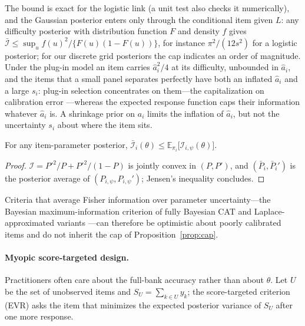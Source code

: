 The bound is exact for the logistic link (a unit test also checks it numerically), and the
Gaussian posterior enters only through the conditional item given $L$: any difficulty
posterior with distribution function $F$ and density $f$ gives
$\bar{\mathcal I}\le\sup_u f(u)^2/\{F(u)(1-F(u))\}$, for instance $\pi^2/(12s^2)$ for a
logistic posterior; for our discrete grid posteriors the cap indicates an order of magnitude.
Under the plug-in model an item carries $\hat a_i^2/4$ at its difficulty, unbounded in
$\hat a_i$, and the items that a small panel separates perfectly have both an inflated
$\hat a_i$ and a large $s_i$: plug-in selection concentrates on them---the capitalization on
calibration error \citep{vanderlinden2000capitalization,patton2013influence}---whereas the
expected response function caps their information whatever $\hat a_i$ is. A shrinkage prior on
$a_i$ limits the inflation of $\hat a_i$, but not the uncertainty $s_i$ about where the item
sits.

\begin{corollary}\label{cor:jensen}
For any item-parameter posterior, $\bar{\mathcal I}_i(\theta)\le\mathbb E_{\pi_i}\big[\mathcal I_{i,\psi}(\theta)\big]$.
\end{corollary}

\begin{proof}
$\mathcal I=P'^2/P+P'^2/(1-P)$ is jointly convex in $(P,P')$, and $(\bar P_i,\bar P_i')$ is
the posterior average of $(P_{i,\psi},P_{i,\psi}')$; Jensen's inequality concludes.
\end{proof}

Criteria that average Fisher information over parameter uncertainty---the Bayesian
maximum-information criterion of fully Bayesian CAT \citep{vanderlinden2020fast,fink2025accounting}
and Laplace-approximated variants \citep{mandujano2026laplace}---can therefore be optimistic
about poorly calibrated items and do not inherit the cap of Proposition~\ref{prop:cap}.

\paragraph{Myopic score-targeted design.} Practitioners often care about the full-bank
accuracy rather than about $\theta$. Let $U$ be the set of unobserved items and
$S_U=\sum_{k\in U}y_k$; the score-targeted criterion (EVR) asks the item that minimizes the
expected posterior variance of $S_U$ after one more response.

